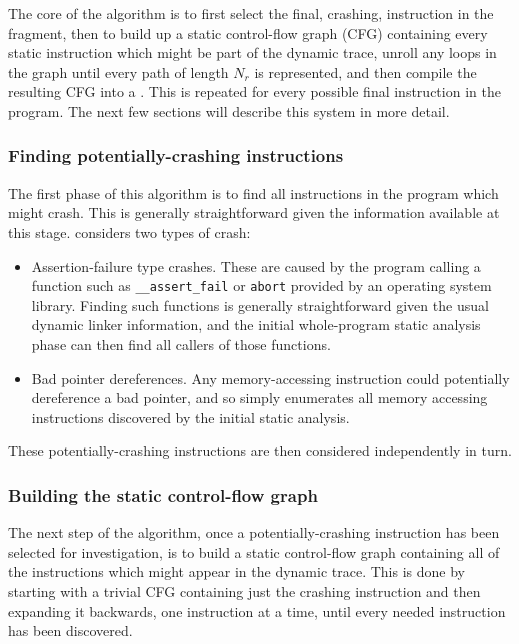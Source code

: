 The core of the algorithm is to first select the final, crashing,
instruction in the fragment, then to build up a static control-flow
graph (CFG) containing every static instruction which might be part of
the dynamic trace, unroll any loops in the graph until every path of
length $N_r$ is represented, and then compile the resulting CFG into a
\StateMachine.  This is repeated for every possible final instruction
in the program.  The next few sections will describe this system in
more detail.

\subsubsection{Finding potentially-crashing instructions}

The first phase of this algorithm is to find all instructions in the
program which might crash.  This is generally straightforward given
the information available at this stage.  {\Implementation} considers
two types of crash:

\begin{itemize}
\item Assertion-failure type crashes.  These are caused by the program
  calling a function such as \verb|__assert_fail| or \verb|abort|
  provided by an operating system library.  Finding such functions is
  generally straightforward given the usual dynamic linker
  information, and the initial whole-program static analysis phase can
  then find all callers of those functions.
\item Bad pointer dereferences.  Any memory-accessing instruction could
  potentially dereference a bad pointer, and so \implementation simply
  enumerates all memory accessing instructions discovered by the initial
  static analysis.
\end{itemize}

These potentially-crashing instructions are then considered
independently in turn.

\subsubsection{Building the static control-flow graph}
The next step of the algorithm, once a potentially-crashing
instruction has been selected for investigation, is to build a static
control-flow graph containing all of the instructions which might
appear in the dynamic trace.  This is done by starting with a trivial
CFG containing just the crashing instruction and then expanding it
backwards, one instruction at a time, until every needed instruction
has been discovered.


